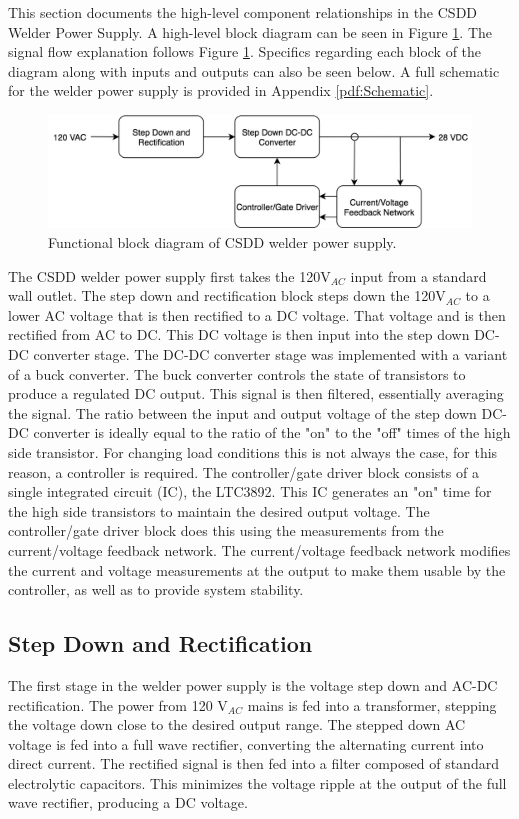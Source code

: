 \documentclass[11pt]{article}
\begin{document}
This section documents the high-level component relationships in the CSDD Welder Power Supply. A high-level block diagram can be seen in Figure \ref{block}. The signal flow explanation follows Figure \ref{block}. Specifics regarding each block of the diagram along with inputs and outputs can also be seen below. A full schematic for the welder power supply is provided in Appendix \ref{pdf:Schematic}.
\newline
\newline 
\begin{figure}[ht]
    \centering
    \includegraphics[scale = 0.5]{block_diagram.png}
    \caption{Functional block diagram of CSDD welder power supply.}
    \label{block}
\end{figure}

The CSDD welder power supply first takes the 120V$_{AC}$ input from a standard wall outlet. The step down and rectification block steps down the 120V$_{AC}$ to a lower AC voltage that is then rectified to a DC voltage. That voltage and is then rectified from AC to DC. This DC voltage is then input into the step down DC-DC converter stage. The DC-DC converter stage was implemented with a variant of a buck converter. The buck converter controls the state of transistors to produce a regulated DC output. This signal is then filtered, essentially averaging the signal. The ratio between the input and output voltage of the step down DC-DC converter is ideally equal to the ratio of the "on" to the "off" times of the high side transistor. For changing load conditions this is not always the case, for this reason, a controller is required. The controller/gate driver block consists of a single integrated circuit (IC), the LTC3892. This IC generates an "on" time for the high side transistors to maintain the desired output voltage. The controller/gate driver block does this using the measurements from the current/voltage feedback network. The current/voltage feedback network modifies the current and voltage measurements at the output to make them usable by the controller, as well as to provide system stability.


    \subsection{Step Down and Rectification}
        The first stage in the welder power supply is the voltage step down and AC-DC rectification. The power from 120 V$_{AC}$ mains is fed into a transformer, stepping the voltage down close to the desired output range. The stepped down AC voltage is fed into a full wave rectifier, converting the alternating current into direct current. The rectified signal is then fed into a filter composed of standard electrolytic capacitors. This minimizes the voltage ripple at the output of the full wave rectifier, producing a DC voltage.
        
\end{document}
